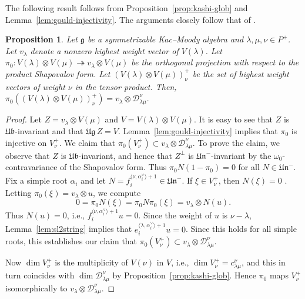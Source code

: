 \documentclass[12pt,reqno]{amsart}
\theoremstyle{plain}
\newtheorem{proposition}[theorem]{Proposition}
\theoremstyle{definition}
\theoremstyle{remark}
\theoremstyle{plain}
\newcommand{\mcd}{\mathcal{D}_{\!\lambda\mu}^{\nu}}
\newcommand{\lie}{\mathfrak}
\begin{document}
The following result follows from Proposition~\ref{prop:kashi-glob} and Lemma~\ref{lem:gould-injectivity}. The arguments closely follow that of \cite[Theorem 2]{GE}.
\begin{proposition}\label{prop:pi0-image}
    Let $\mathfrak{g}$ be a symmetrizable Kac--Moody algebra and $\lambda, \mu, \nu \in P^+$. 
    Let $v_\lambda$ denote a nonzero highest weight vector of $V(\lambda)$. Let $\pi_0: V(\lambda)\otimes V(\mu)\twoheadrightarrow v_\lambda\otimes V(\mu)$ be the orthogonal projection with respect to the product Shapovalov form. Let $\left(V(\lambda)\otimes V(\mu)\right)_{\nu}^+$  be the set of highest weight vectors of weight $\nu$ in the tensor product. Then, $\pi_0(\left(V(\lambda)\otimes V(\mu)\right)_\nu^+)= v_{\lambda}\otimes \mcd.$
\end{proposition}
\begin{proof}
Let $Z = v_\lambda \otimes V(\mu)$ and $V = V(\lambda) \otimes V(\mu)$. It is easy to see that $Z$ is $\lie{Ub}$-invariant and that $\lie{Ug} \,Z = V$. Lemma~\ref{lem:gould-injectivity} implies that $\pi_0$ is injective on $V_\nu^+$. We claim that $\pi_0(V^+_\nu) \subset v_\lambda \otimes \mcd$. To prove the claim, we observe that $Z$ is $\lie{Ub}$-invariant, and hence that $Z^\perp$ is $\lie{Un}^-$-invariant by the $\omega_0$-contravariance of the Shapovalov form. Thus $\pi_0 N (1-\pi_0)=0$ for all $N \in \lie{Un}^-$. Fix a simple root $\alpha_i$ and let  $N = f_i^{\langle \nu, \alpha_i^\vee\rangle +1} \in \lie{Un}^-$. If $\xi \in V^+_\nu$, then $N(\xi) =0$ . Letting $\pi_0(\xi) = v_\lambda \otimes u$, we compute 
\[ 0 = \pi_0 N (\xi) = \pi_0 N \pi_0(\xi) = v_\lambda \otimes N(u). \]
Thus $N(u) = 0$, i.e., $f_i^{\langle \nu, \alpha_i^\vee\rangle +1} u =0$. Since the weight of $u$ is $\nu-\lambda$, Lemma~\ref{lem:sl2string} implies that $e_i^{\langle \lambda, \alpha_i^\vee\rangle +1} u =0$. Since this holds for all simple roots, this establishes our claim that $\pi_0(V^+_\nu) \subset v_\lambda \otimes \mcd$.

Now 
$\dim V_\nu^+$ is the multiplicity of $V(\nu)$ in $V$, i.e., $\dim V_\nu^+ = c_{\lambda\mu}^\nu$, and this in turn coincides with $\dim \mcd$ by Proposition~\ref{prop:kashi-glob}. Hence $\pi_0$ maps $V^+_\nu$ isomorphically to $v_\lambda \otimes \mcd$. 
\end{proof}
\end{document}
